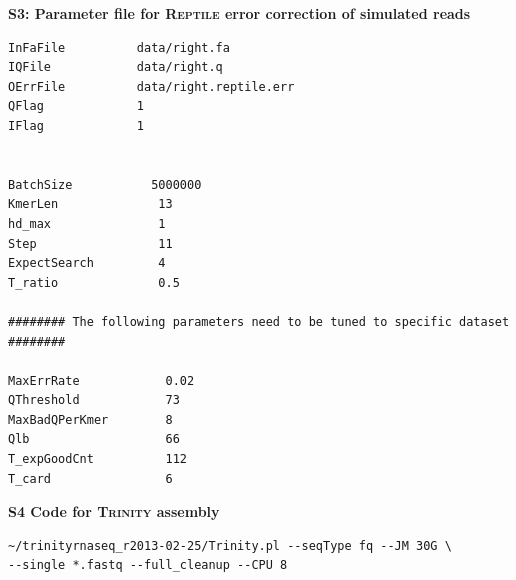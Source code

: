 \documentclass[11pt]{article}
\begin{document}
\vspace{8mm}

\noindent
\textbf{\large{S3: Parameter file for \textsc{Reptile} error correction of simulated reads}}
\normalsize

\lstset{language=Bash} 
\begin{lstlisting}
InFaFile          data/right.fa
IQFile            data/right.q
OErrFile          data/right.reptile.err
QFlag             1
IFlag             1


BatchSize           5000000
KmerLen              13
hd_max               1
Step                 11
ExpectSearch         4
T_ratio              0.5

######## The following parameters need to be tuned to specific dataset ########

MaxErrRate            0.02
QThreshold            73
MaxBadQPerKmer        8
Qlb                   66
T_expGoodCnt          112
T_card                6
\end{lstlisting}
\vspace{8mm}




\vspace{8mm}
\noindent
\textbf{\large{S4 Code for \textsc{Trinity} assembly}}
\normalsize


\begin{lstlisting}
~/trinityrnaseq_r2013-02-25/Trinity.pl --seqType fq --JM 30G \
--single *.fastq --full_cleanup --CPU 8
\end{lstlisting}
\end{document}
